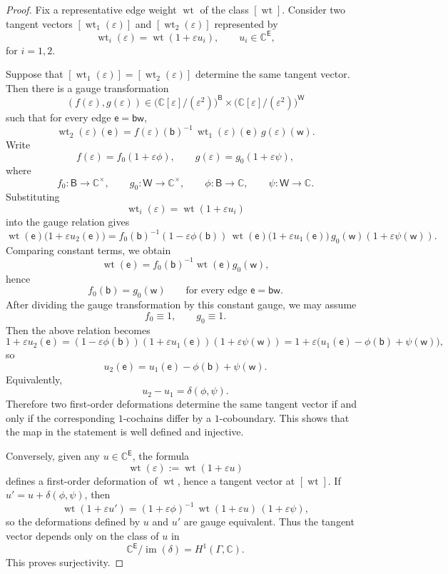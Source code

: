 \documentclass[dvipsnames,11pt]{article}
\theoremstyle{definition}
\newcommand{\wt}{\operatorname{wt}}
\newcommand{\C}{{\mathbb C}}
\def\B{\mathsf B}
\def\W{\mathsf W}
\def\w{\mathsf w}
\def\b{\mathsf b}
\def\e{\mathsf e}
\def\E{\mathsf E}
\DeclareMathOperator{\im}{im}
\begin{document}
\begin{proof}
Fix a representative edge weight \(\wt\) of the class \([\wt]\). Consider two tangent vectors $[\wt_1(\varepsilon)]$ and $[\wt_2(\varepsilon)]$ represented by
\[
\wt_i(\varepsilon)=\wt(1+\varepsilon u_i),
\qquad
u_i\in \C^{\E},
\]
for \(i=1,2\).

Suppose that \([\wt_1(\varepsilon)]=[\wt_2(\varepsilon)]\) determine the same tangent vector. Then there is a gauge transformation
\[
(f(\varepsilon),g(\varepsilon))
\in
\bigl(\C[\varepsilon]/(\varepsilon^2)\bigr)^{\B}
\times
\bigl(\C[\varepsilon]/(\varepsilon^2)\bigr)^{\W}
\]
such that for every edge \(\e=\b\w\),
\[
\wt_2(\varepsilon)(\e)
=
f(\varepsilon)(\b)^{-1}\,\wt_1(\varepsilon)(\e)\,g(\varepsilon)(\w).
\]
Write
\[
f(\varepsilon)=f_0(1+\varepsilon \phi),
\qquad
g(\varepsilon)=g_0(1+\varepsilon \psi),
\]
where
\[
f_0:\B\to\C^\times,\qquad g_0:\W\to\C^\times,
\qquad
\phi:\B\to\C,\qquad \psi:\W\to\C.
\]
Substituting
\[
\wt_i(\varepsilon)=\wt(1+\varepsilon u_i)
\]
into the gauge relation gives
\[
\wt(\e)\bigl(1+\varepsilon u_2(\e)\bigr)
=
f_0(\b)^{-1}(1-\varepsilon \phi(\b))\,
\wt(\e)\bigl(1+\varepsilon u_1(\e)\bigr)\,
g_0(\w)(1+\varepsilon \psi(\w)).
\]
Comparing constant terms, we obtain
\[
\wt(\e)=f_0(\b)^{-1}\wt(\e)g_0(\w),
\]
hence
\[
f_0(\b)=g_0(\w)
\qquad
\text{for every edge } \e=\b\w.
\]
After dividing the gauge transformation by this constant gauge, we may assume
\[
f_0\equiv 1,
\qquad
g_0\equiv 1.
\]
Then the above relation becomes
\[
1+\varepsilon u_2(\e)
=
(1-\varepsilon \phi(\b))(1+\varepsilon u_1(\e))(1+\varepsilon \psi(\w))
=
1+\varepsilon\bigl(u_1(\e)-\phi(\b)+\psi(\w)\bigr),
\]
so
\[
u_2(\e)=u_1(\e)-\phi(\b)+\psi(\w).
\]
Equivalently,
\[
u_2-u_1=\delta(\phi,\psi).
\]
Therefore two first-order deformations determine the same tangent vector if and only if the corresponding \(1\)-cochains differ by a \(1\)-coboundary. This shows that the map in the statement is well defined and injective.

Conversely, given any \(u\in \C^{\E}\), the formula
\[
\wt(\varepsilon):=\wt(1+\varepsilon u)
\]
defines a first-order deformation of \(\wt\), hence a tangent vector at \([\wt]\). If \(u'=u+\delta(\phi,\psi)\), then
\[
\wt(1+\varepsilon u')
=
(1+\varepsilon \phi)^{-1}\,\wt(1+\varepsilon u)\,(1+\varepsilon \psi),
\]
so the deformations defined by \(u\) and \(u'\) are gauge equivalent. Thus the tangent vector depends only on the class of \(u\) in
\[
\C^{\E}/\im(\delta)=H^1(\Gamma,\C).
\]
This proves surjectivity.
\end{proof}
\end{document}
